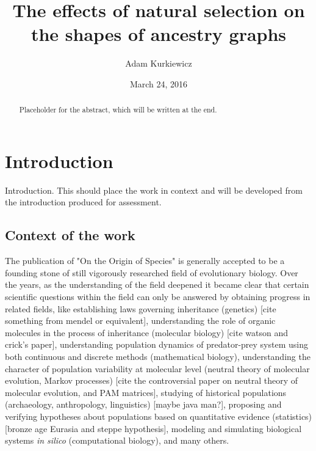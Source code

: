\documentclass{l4proj}
\begin{document}
\title{The effects of natural selection on the shapes of ancestry graphs}
\author{Adam Kurkiewicz}
\date{March 24, 2016}
\maketitle

\begin{abstract}
Placeholder for the abstract, which will be written at the end.
\end{abstract}

\educationalconsent
%
%
\tableofcontents
\chapter{Introduction}
\label{intro}
Introduction. This should place the work in context and will be developed from the introduction produced for assessment.


\section{Context of the work}

The publication of "On the Origin of Species" is generally accepted to be a founding stone of still vigorously researched field of evolutionary biology. Over the years, as the understanding of the field deepened it became clear that certain scientific questions within the field can only be answered by obtaining progress in related fields, like establishing laws governing inheritance (genetics) [cite something from mendel or equivalent], understanding the role of organic molecules in the process of inheritance (molecular biology) [cite watson and crick's paper], understanding population dynamics of predator-prey system using both continuous and discrete methods (mathematical biology), understanding the character of population variability at molecular level (neutral theory of molecular evolution, Markov processes) [cite the controversial paper on neutral theory of molecular evolution, and PAM matrices], studying of historical populations (archaeology, anthropology, linguistics) [maybe java man?], proposing and verifying hypotheses about populations based on quantitative evidence (statistics) [bronze age Eurasia and steppe hypothesis], modeling and simulating biological systems \textit{in silico} (computational biology), and many others.
\end{document}

